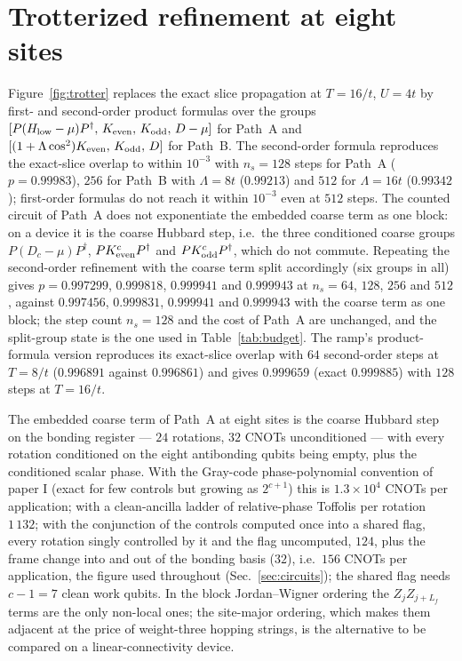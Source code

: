 \documentclass[a4paper,11pt,noarxiv]{quantumarticle}
\newcommand{\Hlow}{H_{\mathrm{low}}}
\begin{document}
\section{Trotterized refinement at eight sites}
\label{sm:trotter}
Figure~\ref{fig:trotter} replaces the exact slice propagation at $T=16/t$,
$U=4t$ by first- and second-order product formulas over the groups
$[P(\Hlow-\mu)P^\dagger,\,K_{\rm even},\,K_{\rm odd},\,D-\mu]$ for Path~A
and $[(1+\Lambda\cos^2)K_{\rm even},\,K_{\rm odd},\,D]$ for Path~B.  The
second-order formula reproduces the exact-slice overlap to within $10^{-3}$
with $n_s=128$ steps for Path~A ($p=0.99983$), $256$ for Path~B with
$\Lambda=8t$ ($0.99213$) and $512$ for $\Lambda=16t$ ($0.99342$);
first-order formulas do not reach it within $10^{-3}$ even at $512$ steps.
The counted circuit of Path~A does not exponentiate the embedded coarse
term as one block: on a device it is the coarse Hubbard step, i.e.\ the
three conditioned coarse groups $P(D_c-\mu)P^\dagger$,
$PK^c_{\rm even}P^\dagger$ and $PK^c_{\rm odd}P^\dagger$, which do not
commute.  Repeating the second-order refinement with the coarse term split
accordingly (six groups in all) gives $p=0.997299$, $0.999818$, $0.999941$
and $0.999943$ at $n_s=64$, $128$, $256$ and $512$, against $0.997456$,
$0.999831$, $0.999941$ and $0.999943$ with the coarse term as one block;
the step count $n_s=128$ and the cost of Path~A are unchanged, and the
split-group state is the one used in Table~\ref{tab:budget}.  The ramp's
product-formula version reproduces its exact-slice overlap with $64$
second-order steps at $T=8/t$ ($0.996891$ against $0.996861$) and gives
$0.999659$ (exact $0.999885$) with $128$ steps at $T=16/t$.

The embedded coarse term of Path~A at eight sites is the coarse Hubbard
step on the bonding register --- $24$ rotations, $32$ CNOTs unconditioned
--- with every rotation conditioned on the eight antibonding qubits being
empty, plus the conditioned scalar phase.  With the Gray-code
phase-polynomial convention of paper I (exact for few controls but growing
as $2^{c+1}$) this is $1.3\times10^4$ CNOTs per application; with a
clean-ancilla ladder of relative-phase Toffolis per rotation $1\,132$; with
the conjunction of the controls computed once into a shared flag, every
rotation singly controlled by it and the flag uncomputed, $124$, plus the
frame change into and out of the bonding basis ($32$), i.e.\ $156$ CNOTs
per application, the figure used throughout (Sec.~\ref{sec:circuits}); the
shared flag needs $c-1=7$ clean work qubits.  In the block Jordan--Wigner ordering the $Z_jZ_{j+L_f}$ terms
are the only non-local ones; the site-major ordering, which makes them
adjacent at the price of weight-three hopping strings, is the alternative
to be compared on a linear-connectivity device.
\end{document}
